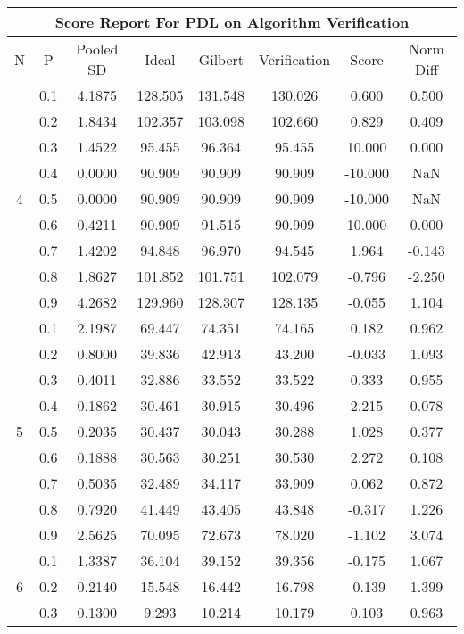 \documentclass[11pt,a4paper]{report}
\begin{document}
\begin{longtable}{ | c | c || c | c | c | c | c | c | }
\hline
\multicolumn{8}{|c|}{ Score Report For PDL on Algorithm Verification} \\
\hline
N & P & Pooled SD &  Ideal &  Gilbert & Verification  & Score & Norm Diff \\
 \hline
 \hline
 \endhead
\multirow{9}{*}{4} & 0.1 & 4.1875 & 128.505 & 131.548 & 130.026 & 0.600 & 0.500 \\
 & 0.2 & 1.8434 & 102.357 & 103.098 & 102.660 & 0.829 & 0.409 \\
 & 0.3 & 1.4522 & 95.455 & 96.364 & 95.455 & 10.000 & 0.000 \\
 & 0.4 & 0.0000 & 90.909 & 90.909 & 90.909 & -10.000 & NaN \\
 & 0.5 & 0.0000 & 90.909 & 90.909 & 90.909 & -10.000 & NaN \\
 & 0.6 & 0.4211 & 90.909 & 91.515 & 90.909 & 10.000 & 0.000 \\
 & 0.7 & 1.4202 & 94.848 & 96.970 & 94.545 & 1.964 & -0.143 \\
 & 0.8 & 1.8627 & 101.852 & 101.751 & 102.079 & -0.796 & -2.250 \\
 & 0.9 & 4.2682 & 129.960 & 128.307 & 128.135 & -0.055 & 1.104 \\
 \hline
\multirow{9}{*}{5} & 0.1 & 2.1987 & 69.447 & 74.351 & 74.165 & 0.182 & 0.962 \\
 & 0.2 & 0.8000 & 39.836 & 42.913 & 43.200 & -0.033 & 1.093 \\
 & 0.3 & 0.4011 & 32.886 & 33.552 & 33.522 & 0.333 & 0.955 \\
 & 0.4 & 0.1862 & 30.461 & 30.915 & 30.496 & 2.215 & 0.078 \\
 & 0.5 & 0.2035 & 30.437 & 30.043 & 30.288 & 1.028 & 0.377 \\
 & 0.6 & 0.1888 & 30.563 & 30.251 & 30.530 & 2.272 & 0.108 \\
 & 0.7 & 0.5035 & 32.489 & 34.117 & 33.909 & 0.062 & 0.872 \\
 & 0.8 & 0.7920 & 41.449 & 43.405 & 43.848 & -0.317 & 1.226 \\
 & 0.9 & 2.5625 & 70.095 & 72.673 & 78.020 & -1.102 & 3.074 \\
 \hline
\multirow{9}{*}{6} & 0.1 & 1.3387 & 36.104 & 39.152 & 39.356 & -0.175 & 1.067 \\
 & 0.2 & 0.2140 & 15.548 & 16.442 & 16.798 & -0.139 & 1.399 \\
 & 0.3 & 0.1300 & 9.293 & 10.214 & 10.179 & 0.103 & 0.963 \\

\end{longtable}
\end{document}
